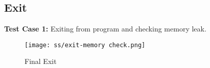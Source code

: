 \documentclass{article}
\begin{document}

\subsection{Exit}
\textbf{Test Case 1:} Exiting from program and checking memory leak.
        \begin{figure}[H]
                \centering
                \texttt{[image: ss/exit-memory check.png]}
                \caption{Final Exit}
        \label{fig:exit_prg}
        \end{figure}
\end{document}
